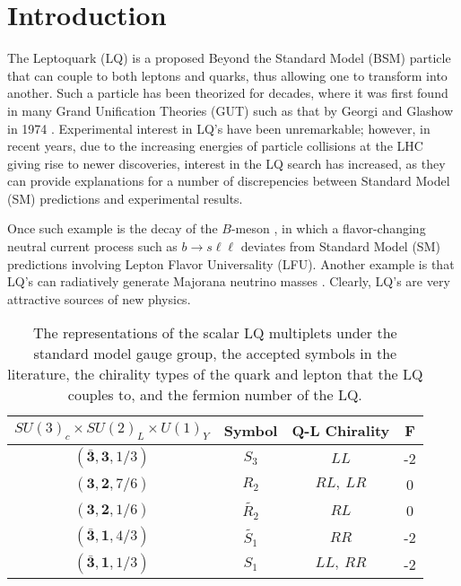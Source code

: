 \section{Introduction}
    The Leptoquark (LQ) is a proposed Beyond the Standard Model (BSM) particle that can couple to both leptons and quarks, thus allowing one to transform into another. Such a particle has been theorized for decades, where it was first found in many Grand Unification Theories (GUT) such as that by Georgi and Glashow in 1974 \cite{Georgi_1974}. Experimental interest in LQ's have been unremarkable; however, in recent years, due to the increasing energies of particle collisions at the LHC giving rise to newer discoveries, interest in the LQ search has increased, as they can provide explanations for a number of discrepencies between Standard Model (SM) predictions and experimental results. 
    
    Once such example is the decay of the $B$-meson \cite{Hiller_2014}, in which a flavor-changing neutral current process such as $b \rightarrow s \ell\ell$ deviates from Standard Model (SM) predictions involving Lepton Flavor Universality (LFU). Another example is that LQ's can radiatively generate Majorana neutrino masses \cite{Mahanta_2000}. Clearly, LQ's are very attractive sources of new physics.

    \renewcommand{\arraystretch}{1.35}
    \begin{table}[b]
        \centering
        \begin{tabular}{|c|c|c|c|}
            \hline
            $SU(3)_c \times SU(2)_L \times U(1)_Y$ & Symbol & Q-L Chirality & F \\ \hline
            $(\bar{\bm{3}}, \bm{3}, 1/3)$ & $S_3$         & $LL$      & -2 \\ \hline
            $(\bm{3}, \bm{2}, 7/6)$       & $R_2$         & $RL,\ LR$ & 0 \\ \hline
            $(\bm{3}, \bm{2}, 1/6)$       & $\tilde{R_2}$ & $RL$      & 0 \\ \hline
            $(\bar{\bm{3}}, \bm{1}, 4/3)$ & $\tilde{S_1}$ & $RR$      & -2 \\ \hline
            $(\bar{\bm{3}}, \bm{1}, 1/3)$ & $S_1$         & $LL,\ RR$ & -2 \\ \hline
        \end{tabular}
        \caption{The representations of the scalar LQ multiplets under the standard model gauge group, the accepted symbols in the literature, the chirality types of the quark and lepton that the LQ couples to, and the fermion number of the LQ.}
        \label{mulipletTable}
    \end{table}
    \renewcommand{\arraystretch}{1}

